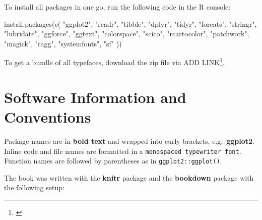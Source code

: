 \documentclass[
]{krantz}
\makeatletter
\newenvironment{Shaded}{\begin{snugshade}}{\end{snugshade}}
\newcommand{\FunctionTok}[1]{\textcolor[rgb]{0,0,0}{#1}}
\newcommand{\NormalTok}[1]{#1}
\newcommand{\StringTok}[1]{\textcolor[rgb]{0.5,0.5,0.5}{#1}}
\renewcommand{\href}[2]{#2\footnote{\url{#1}}}
\newenvironment{kframe}{%
\medskip{}
\setlength{\fboxsep}{.8em}
 \def\at@end@of@kframe{}%
 \ifinner\ifhmode%
  \def\at@end@of@kframe{\end{minipage}}%
  \begin{minipage}{\columnwidth}%
 \fi\fi%
 \def\FrameCommand##1{\hskip\@totalleftmargin \hskip-\fboxsep
 \colorbox{shadecolor}{##1}\hskip-\fboxsep
     \hskip-\linewidth \hskip-\@totalleftmargin \hskip\columnwidth}%
 \MakeFramed {\advance\hsize-\width
   \@totalleftmargin\z@ \linewidth\hsize
   \@setminipage}}%
 {\par\unskip\endMakeFramed%
 \at@end@of@kframe}
\renewenvironment{Shaded}{\begin{kframe}}{\end{kframe}}
\makeatother
\begin{document}
To install all packages in one go, run the following code in the R console:

\begin{Shaded}
\begin{Highlighting}[]
\FunctionTok{install.packages}\NormalTok{(}\FunctionTok{c}\NormalTok{(}
  \StringTok{"ggplot2"}\NormalTok{, }\StringTok{"readr"}\NormalTok{, }\StringTok{"tibble"}\NormalTok{, }\StringTok{"dplyr"}\NormalTok{, }\StringTok{"tidyr"}\NormalTok{, }\StringTok{"forcats"}\NormalTok{, }
  \StringTok{"stringr"}\NormalTok{, }\StringTok{"lubridate"}\NormalTok{, }\StringTok{"ggforce"}\NormalTok{, }\StringTok{"ggtext"}\NormalTok{, }\StringTok{"colorspace"}\NormalTok{, }\StringTok{"scico"}\NormalTok{,}
  \StringTok{"rcartocolor"}\NormalTok{, }\StringTok{"patchwork"}\NormalTok{, }\StringTok{"magick"}\NormalTok{, }\StringTok{"ragg"}\NormalTok{, }\StringTok{"systemfonts"}\NormalTok{, }\StringTok{"sf"}
\NormalTok{))}
\end{Highlighting}
\end{Shaded}

To get a bundle of all typefaces, download the zip file via \href{}{ADD LINK}.

\hypertarget{software-information-and-conventions}{%
\section*{Software Information and Conventions}\label{software-information-and-conventions}}


Package names are in \textbf{bold text} and wrapped into curly brackets, e.g.~\textbf{ggplot2}. Inline code and file names are formatted in a \texttt{monospaced\ typewriter\ font}. Function names are followed by parentheses as in \texttt{ggplot2::ggplot()}.

The book was written with the \textbf{knitr} package \citep{xie2015} and the \textbf{bookdown} package \citep{R-bookdown} with the following setup:
\end{document}

